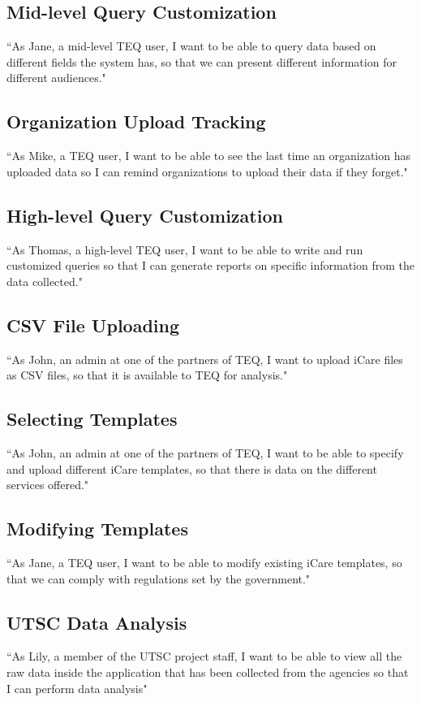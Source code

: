 \documentclass[12pt]{article}
\begin{document}
\subsection{Mid-level Query Customization}
``As Jane, a mid-level TEQ user, I want to be able to query data based on different fields the system has, so that we can present different information for different audiences."

\subsection{Organization Upload Tracking}
``As Mike, a TEQ user, I want to be able to see the last time an organization has uploaded data so I can remind organizations to upload their data if they forget."

\subsection{High-level Query Customization}
``As Thomas, a high-level TEQ user, I want to be able to write and run customized queries so that I can generate reports on specific information from the data collected."

\subsection{CSV File Uploading}
``As John, an admin at one of the partners of TEQ, I want to upload iCare files as CSV files, so that it is available to TEQ for analysis."

\subsection{Selecting Templates}
``As John, an admin at one of the partners of TEQ,  I want to be able to specify and upload different iCare templates, so that there is data on the different services offered."

\subsection{Modifying Templates}
``As Jane, a TEQ user,  I want to be able to modify existing iCare templates, so that we can comply with regulations set by the government."

\subsection{UTSC Data Analysis}
``As Lily, a member of the UTSC project staff, I want to be able to view all the raw data inside the application that has been collected from the agencies so that I can perform data analysis" 


\newpage


\end{document}
